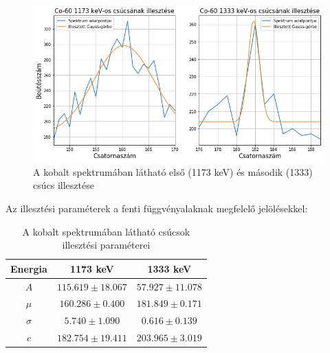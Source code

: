 \documentclass[12pt,a4paper]{article}
\begin{document}
\begin{figure}[!h]
\hspace*{-0.75cm}
\includegraphics[scale=0.60]{Cob_figs}
\caption{A kobalt spektrumában látható első (1173 keV) és második (1333) csúcs illesztése}
\label{fig:2}
\end{figure}

Az illesztési paraméterek a fenti függvényalaknak megfelelő jelölésekkel:
\begin{table}[!h]
\begin{center}
\begin{tabular}{|c|c||c|}
\hline
Energia & 1173 keV & 1333 keV \\ 
\hline
$A$ & $115.619 \pm 18.067$ & $57.927 \pm 11.078$\\
\hline
$\mu$ & $160.286 \pm 0.400$ & $181.849 \pm 0.171$\\
\hline
$\sigma$ & $5.740 \pm 1.090$ & $0.616 \pm 0.139$ \\
\hline
$c$ & $182.754 \pm 19.411$ & $203.965 \pm 3.019$\\
\hline
\end{tabular}
\caption{A kobalt spektrumában látható csúcsok illesztési paraméterei}
\end{center}
\end{table}

\newpage
\end{document}
